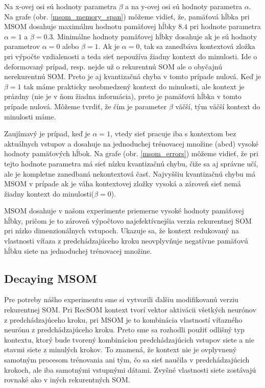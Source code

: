  Na x-ovej osi sú hodnoty parametra $\beta$ a na y-ovej osi sú hodnoty parametra $\alpha$. 
 Na grafe (obr. \ref{msom_memory_span}) môžeme vidieť, že, pamäťová hĺbka pri MSOM dosahuje maximálnu 
 hodnotu pamäťovej hĺbky $8.4$ pri hodnote parametra $\alpha = 1$ a $\beta = 0.3$.  
 Minimálne hodnoty pamäťovej hĺbky dosahuje ak je sú hodnoty parametrov $\alpha = 0$ alebo $\beta = 1$. 
 Ak je $\alpha = 0$, tak sa zanedbáva kontextová zložka pri výpočte vzdialenosti a teda sieť nepoužíva žiadny kontext do minulosti. Ide o deformovaný prípad, resp. 
 nejde už o rekurentnú SOM ale o obyčajnú nerekurentnú SOM. Preto je aj kvantizačná chyba v tomto prípade nulová.
 Keď je $\beta = 1$ tak máme prakticky neobmedzený kontext do minulosti, ale kontext je prázdny (nie je v ňom žiadna informácia), preto je 
 pamäťová hĺbka v tomto prípade nulová. Môžeme tvrdiť, že čím je parameter $\beta$ väčší, tým väčší kontext do minulosti máme.
 
 Zaujímavý je prípad, keď je $\alpha = 1$, vtedy sieť pracuje iba s kontextom bez aktuálnych vstupov a dosahuje na jednoduchej trénovacej množine (abcd)
 vysoké hodnoty pamäťových hĺbok.
 Na grafe (obr. \ref{msom_errors}) môžeme vidieť, že pri tejto hodnote parametra má sieť nízku kvantizačnú chybu, čiže sa aj správne učí, ale je kompletne 
 zanedbaná nekontextová časť. Najvyššiu kvantizačnú chybu má MSOM v prípade ak je váha kontextovej zložky vysoká a zároveň sieť nemá žiadny kontext do minulosti($\beta = 0$).

 MSOM dosahuje v našom experimente priemerne vysoké hodnoty pamäťovej hĺbky, pričom je to zároveň 
 výpočtovo najefektívnejšia verzia rekurentnej SOM pri nízko dimenzionálnych vstupoch. 
 Ukazuje sa, že kontext redukovaný na vlastnosti víťaza z predchádzajúceho kroku neovplyvňuje negatívne pamäťovú hĺbku siete na jednoduchej trénovacej množine.

\subsection{Decaying MSOM}
Pre potreby nášho experimentu sme si vytvorili ďalšiu modifikovanú verziu %
rekurentnej SOM. Pri RecSOM kontext tvorí vektor aktivácii všetkých neurónov z predchádzajúceho kroku, 
pri MSOM je to kombinácia vlastností víťazného neurónu z predchádzajúceho kroku. 
Preto sme sa rozhodli použiť odlišný typ kontextu, ktorý bude tvorený kombináciou predchádzajúcich vstupov 
siete a nie stavmi siete z minulých krokov. To znamená, že kontext nie je ovplyvnený samotným procesom trénovania
ani tým, čo sa sieť naučila v predchádzajúcich krokoch, ale iba samotnými vstupnými dátami.
Zvyšné vlastnosti siete zostávajú rovnaké ako v iných rekurentných SOM.


